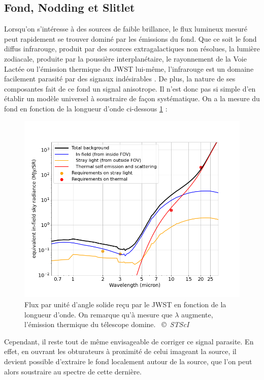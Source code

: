 \documentclass[11pt, a4paper]{article}
\newcommand{\customcite}[2]{\mbox{
  {\small \copyright} \textit{#1} \cite{#2}}
}
\begin{document}
\subsection{Fond, Nodding et Slitlet}

Lorsqu'on s'intéresse à des sources de faible brillance, le flux lumineux mesuré peut rapidement se trouver dominé par les émissions du fond. Que ce soit le fond diffus infrarouge, produit par des sources extragalactiques non résolues, la lumière zodiacale, produite par la poussière interplanétaire, le rayonnement de la Voie Lactée ou l'émission thermique du JWST lui-même, l'infrarouge est un domaine facilement parasité par des signaux indésirables \cite{jwst_background}. De plus, la nature de ses composantes fait de ce fond un signal anisotrope. Il n'est donc pas si simple d'en établir un modèle universel à soustraire de façon systématique. On a la mesure du fond en fonction de la longueur d'onde ci-dessous \ref{fig:background_jwst} : 

\begin{figure}[H]
  \centering
  \includegraphics[scale=0.65]{assets/background_jwst.png}
  \caption{Flux par unité d'angle solide reçu par le JWST en fonction de la longueur d'onde. On remarque qu'à mesure que $\lambda$ augmente, l'émission thermique du télescope domine. \customcite{STScI}{jwst_background}}
  \label{fig:background_jwst}
\end{figure}


Cependant, il reste tout de même envisageable de corriger ce signal parasite. En effet, en ouvrant les obturateurs à proximité de celui imageant la source, il devient possible d'extraire le fond localement autour de la source, que l'on peut alors soustraire au spectre de cette dernière.
\end{document}
